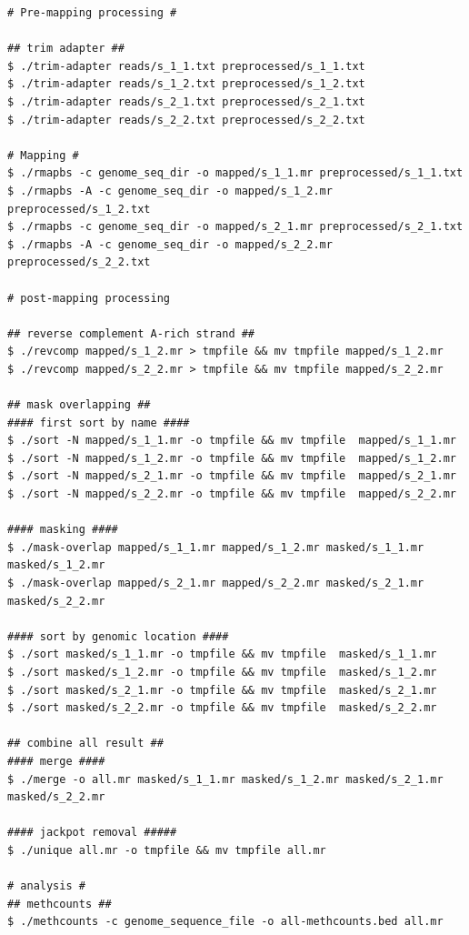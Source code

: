 \documentclass{article}
\begin{document}
\begin{verbatim}
# Pre-mapping processing #

## trim adapter ##
$ ./trim-adapter reads/s_1_1.txt preprocessed/s_1_1.txt
$ ./trim-adapter reads/s_1_2.txt preprocessed/s_1_2.txt
$ ./trim-adapter reads/s_2_1.txt preprocessed/s_2_1.txt
$ ./trim-adapter reads/s_2_2.txt preprocessed/s_2_2.txt

# Mapping #
$ ./rmapbs -c genome_seq_dir -o mapped/s_1_1.mr preprocessed/s_1_1.txt
$ ./rmapbs -A -c genome_seq_dir -o mapped/s_1_2.mr preprocessed/s_1_2.txt
$ ./rmapbs -c genome_seq_dir -o mapped/s_2_1.mr preprocessed/s_2_1.txt
$ ./rmapbs -A -c genome_seq_dir -o mapped/s_2_2.mr preprocessed/s_2_2.txt

# post-mapping processing

## reverse complement A-rich strand ##
$ ./revcomp mapped/s_1_2.mr > tmpfile && mv tmpfile mapped/s_1_2.mr
$ ./revcomp mapped/s_2_2.mr > tmpfile && mv tmpfile mapped/s_2_2.mr

## mask overlapping ##
#### first sort by name ####
$ ./sort -N mapped/s_1_1.mr -o tmpfile && mv tmpfile  mapped/s_1_1.mr 
$ ./sort -N mapped/s_1_2.mr -o tmpfile && mv tmpfile  mapped/s_1_2.mr 
$ ./sort -N mapped/s_2_1.mr -o tmpfile && mv tmpfile  mapped/s_2_1.mr 
$ ./sort -N mapped/s_2_2.mr -o tmpfile && mv tmpfile  mapped/s_2_2.mr 

#### masking ####
$ ./mask-overlap mapped/s_1_1.mr mapped/s_1_2.mr masked/s_1_1.mr masked/s_1_2.mr
$ ./mask-overlap mapped/s_2_1.mr mapped/s_2_2.mr masked/s_2_1.mr masked/s_2_2.mr

#### sort by genomic location ####
$ ./sort masked/s_1_1.mr -o tmpfile && mv tmpfile  masked/s_1_1.mr 
$ ./sort masked/s_1_2.mr -o tmpfile && mv tmpfile  masked/s_1_2.mr 
$ ./sort masked/s_2_1.mr -o tmpfile && mv tmpfile  masked/s_2_1.mr 
$ ./sort masked/s_2_2.mr -o tmpfile && mv tmpfile  masked/s_2_2.mr 

## combine all result ##
#### merge ####
$ ./merge -o all.mr masked/s_1_1.mr masked/s_1_2.mr masked/s_2_1.mr masked/s_2_2.mr 

#### jackpot removal #####
$ ./unique all.mr -o tmpfile && mv tmpfile all.mr

# analysis #
## methcounts ##
$ ./methcounts -c genome_sequence_file -o all-methcounts.bed all.mr 
\end{verbatim}
\end{document}
